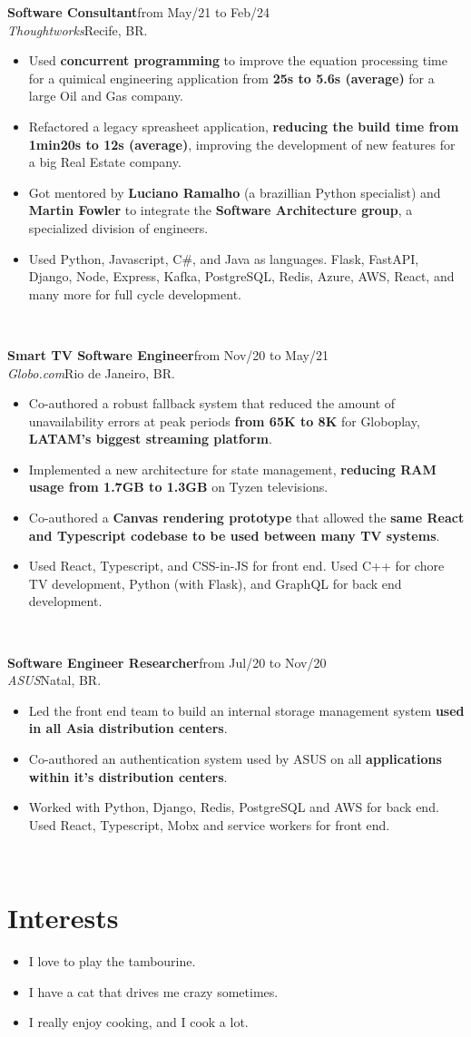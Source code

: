 \documentclass[12pt]{article}
\newcommand{\highlight}[1]{#1}
\newcommand{\jobentry}[5]{\highlight{\textbf{#3}}\hfill #4\\\textit{#1}\hfill #2. #5\\\smallskip}
\begin{document}
\jobentry{Thoughtworks}{Recife, BR}{Software Consultant}{from May/21 to Feb/24}{
    \begin{itemize}
        \item Used \textbf{concurrent programming} to improve the equation processing time for a quimical engineering application from \textbf{25s to 5.6s (average)} for a large Oil and Gas company.
        \item Refactored a legacy spreasheet application, \textbf{reducing the build time from 1min20s to 12s (average)}, improving the development of new features for a big Real Estate company.
        \item Got mentored by \textbf{Luciano Ramalho} (a brazillian Python specialist) and \textbf{Martin Fowler} to integrate the \textbf{Software Architecture group}, a specialized division of engineers.
        \item Used Python, Javascript, C\#, and Java as languages. Flask, FastAPI, Django, Node, Express, Kafka, PostgreSQL, Redis, Azure, AWS, React, and many more for full cycle development.
    \end{itemize}
}

\jobentry{Globo.com}{Rio de Janeiro, BR}{Smart TV Software Engineer}{from Nov/20 to May/21}{
    \begin{itemize}
        \item Co-authored a robust fallback system that reduced the amount of unavailability errors at peak periods \textbf{from 65K to 8K} for Globoplay, \textbf{LATAM's biggest streaming platform}.
        \item Implemented a new architecture for state management, \textbf{reducing RAM usage from 1.7GB to 1.3GB} on Tyzen televisions.
        \item Co-authored a \textbf{Canvas rendering prototype} that allowed the \textbf{same React and Typescript codebase to be used between many TV systems}.
        \item Used React, Typescript, and CSS-in-JS for front end. Used C++ for chore TV development, Python (with Flask), and GraphQL for back end development.
    \end{itemize}
}

\jobentry{ASUS}{Natal, BR}{Software Engineer Researcher}{from Jul/20 to Nov/20}{
    \begin{itemize}
        \item Led the front end team to build an internal storage management system \textbf{used in all Asia distribution centers}.
        \item Co-authored an authentication system used by ASUS on all \textbf{applications within it's distribution centers}.
        \item Worked with Python, Django, Redis, PostgreSQL and AWS for back end. Used React, Typescript, Mobx and service workers for front end.
    \end{itemize}
}

\section{Interests}

\begin{itemize}
    \item I love to play the tambourine.
    \item I have a cat that drives me crazy sometimes.
    \item I really enjoy cooking, and I cook a lot.
\end{itemize}
\end{document}
